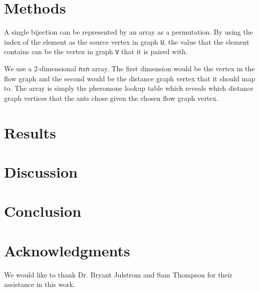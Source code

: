 \documentclass[sigconf]{acmart}
\begin{document}
\section {Methods}
A single bijection can be represented by an array as a permutation. By using the index of the element as the source vertex in graph \verb|U|, the value that the element contains can be the vertex in graph \verb|V| that it is paired with.

We use a 2-dimensional \verb|n|x\verb|n| array. The first dimension would be the vertex in the flow graph and the second would be the distance graph vertex that it should map to. The array is simply the pheromone lookup table which reveals which distance graph vertices that the ants chose given the chosen flow graph vertex.

\section {Results}

\section {Discussion}

\section {Conclusion}

\section {Acknowledgments}
We would like to thank Dr. Bryant Julstrom and Sam Thompson for their assistance in this work.


{}
\end{document}
